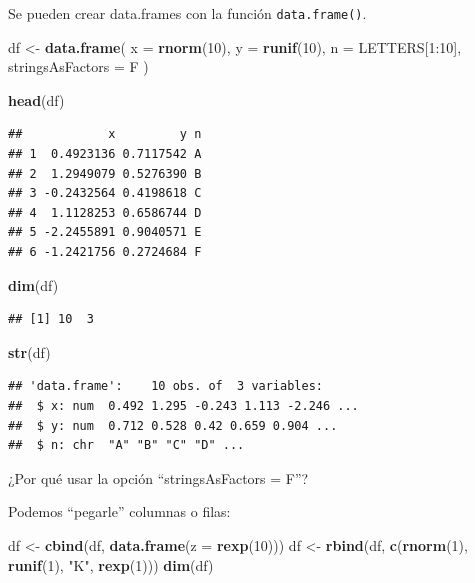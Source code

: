 \documentclass[]{article}
\newenvironment{Shaded}{\begin{snugshade}}{\end{snugshade}}
\newcommand{\KeywordTok}[1]{\textcolor[rgb]{0.13,0.29,0.53}{\textbf{{#1}}}}
\newcommand{\DataTypeTok}[1]{\textcolor[rgb]{0.13,0.29,0.53}{{#1}}}
\newcommand{\DecValTok}[1]{\textcolor[rgb]{0.00,0.00,0.81}{{#1}}}
\newcommand{\StringTok}[1]{\textcolor[rgb]{0.31,0.60,0.02}{{#1}}}
\newcommand{\NormalTok}[1]{{#1}}
\begin{document}
Se pueden crear data.frames con la función \texttt{data.frame()}.

\begin{Shaded}
\begin{Highlighting}[]
\NormalTok{df <-}\StringTok{ }\KeywordTok{data.frame}\NormalTok{(}
  \DataTypeTok{x =} \KeywordTok{rnorm}\NormalTok{(}\DecValTok{10}\NormalTok{),}
  \DataTypeTok{y =} \KeywordTok{runif}\NormalTok{(}\DecValTok{10}\NormalTok{),}
  \DataTypeTok{n =} \NormalTok{LETTERS[}\DecValTok{1}\NormalTok{:}\DecValTok{10}\NormalTok{],}
  \DataTypeTok{stringsAsFactors =} \NormalTok{F}
\NormalTok{)}

\KeywordTok{head}\NormalTok{(df)}
\end{Highlighting}
\end{Shaded}

\begin{verbatim}
##            x         y n
## 1  0.4923136 0.7117542 A
## 2  1.2949079 0.5276390 B
## 3 -0.2432564 0.4198618 C
## 4  1.1128253 0.6586744 D
## 5 -2.2455891 0.9040571 E
## 6 -1.2421756 0.2724684 F
\end{verbatim}

\begin{Shaded}
\begin{Highlighting}[]
\KeywordTok{dim}\NormalTok{(df)}
\end{Highlighting}
\end{Shaded}

\begin{verbatim}
## [1] 10  3
\end{verbatim}

\begin{Shaded}
\begin{Highlighting}[]
\KeywordTok{str}\NormalTok{(df)}
\end{Highlighting}
\end{Shaded}

\begin{verbatim}
## 'data.frame':    10 obs. of  3 variables:
##  $ x: num  0.492 1.295 -0.243 1.113 -2.246 ...
##  $ y: num  0.712 0.528 0.42 0.659 0.904 ...
##  $ n: chr  "A" "B" "C" "D" ...
\end{verbatim}

\begin{curiosidad}
¿Por qué usar la opción ``stringsAsFactors = F''?
\end{curiosidad}

Podemos ``pegarle'' columnas o filas:

\begin{Shaded}
\begin{Highlighting}[]
\NormalTok{df <-}\StringTok{ }\KeywordTok{cbind}\NormalTok{(df, }\KeywordTok{data.frame}\NormalTok{(}\DataTypeTok{z =} \KeywordTok{rexp}\NormalTok{(}\DecValTok{10}\NormalTok{)))}
\NormalTok{df <-}\StringTok{ }\KeywordTok{rbind}\NormalTok{(df, }\KeywordTok{c}\NormalTok{(}\KeywordTok{rnorm}\NormalTok{(}\DecValTok{1}\NormalTok{), }\KeywordTok{runif}\NormalTok{(}\DecValTok{1}\NormalTok{), }\StringTok{"K"}\NormalTok{, }\KeywordTok{rexp}\NormalTok{(}\DecValTok{1}\NormalTok{)))}
\KeywordTok{dim}\NormalTok{(df)}
\end{Highlighting}
\end{Shaded}
\end{document}
